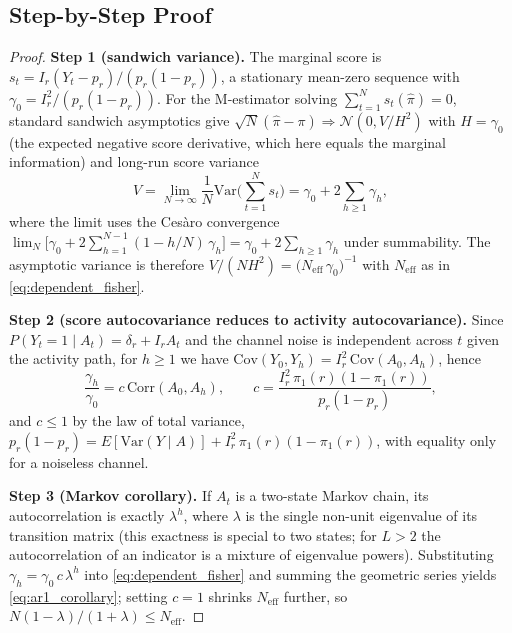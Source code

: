\documentclass[11pt,a4paper]{article}
\begin{document}
\subsection{Step-by-Step Proof}
\begin{proof}
\textbf{Step 1 (sandwich variance).} The marginal score is $s_t = I_r (Y_t - p_r) / (p_r(1 - p_r))$, a stationary mean-zero sequence with $\gamma_0 = I_r^2 / (p_r(1-p_r))$. For the M-estimator solving $\sum_{t=1}^N s_t(\hat\pi) = 0$, standard sandwich asymptotics give $\sqrt{N}(\hat\pi - \pi) \Rightarrow \mathcal{N}(0, V / H^2)$ with $H = \gamma_0$ (the expected negative score derivative, which here equals the marginal information) and long-run score variance %
\[
V = \lim_{N \to \infty} \frac{1}{N} \mathrm{Var}\Big( \sum_{t=1}^N s_t \Big) = \gamma_0 + 2 \sum_{h \ge 1} \gamma_h,
\]
where the limit uses the Ces\`aro convergence $\lim_N \big[ \gamma_0 + 2\sum_{h=1}^{N-1} (1 - h/N)\, \gamma_h \big] = \gamma_0 + 2\sum_{h \ge 1} \gamma_h$ under summability. The asymptotic variance is therefore $V / (N H^2) = \big( N_{\mathrm{eff}}\, \gamma_0 \big)^{-1}$ with $N_{\mathrm{eff}}$ as in \eqref{eq:dependent_fisher}. %

\textbf{Step 2 (score autocovariance reduces to activity autocovariance).} Since $P(Y_t = 1 \mid A_t) = \delta_r + I_r A_t$ and the channel noise is independent across $t$ given the activity path, for $h \ge 1$ we have $\mathrm{Cov}(Y_0, Y_h) = I_r^2\, \mathrm{Cov}(A_0, A_h)$, hence %
\[
\frac{\gamma_h}{\gamma_0} = c\, \mathrm{Corr}(A_0, A_h), \qquad c = \frac{I_r^2\, \pi_1(r)(1 - \pi_1(r))}{p_r(1 - p_r)},
\]
and $c \le 1$ by the law of total variance, $p_r(1 - p_r) = E[\mathrm{Var}(Y \mid A)] + I_r^2\, \pi_1(r)(1 - \pi_1(r))$, with equality only for a noiseless channel. %

\textbf{Step 3 (Markov corollary).} If $A_t$ is a two-state Markov chain, its autocorrelation is exactly $\lambda^h$, where $\lambda$ is the single non-unit eigenvalue of its transition matrix (this exactness is special to two states; for $L > 2$ the autocorrelation of an indicator is a mixture of eigenvalue powers). Substituting $\gamma_h = \gamma_0\, c\, \lambda^h$ into \eqref{eq:dependent_fisher} and summing the geometric series yields \eqref{eq:ar1_corollary}; setting $c = 1$ shrinks $N_{\mathrm{eff}}$ further, so $N(1-\lambda)/(1+\lambda) \le N_{\mathrm{eff}}$. %
\end{proof}
\end{document}
